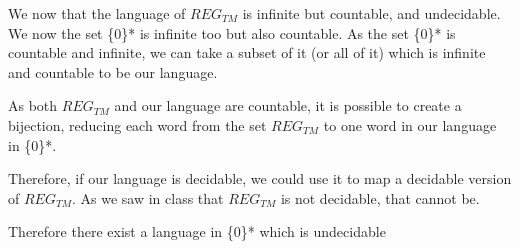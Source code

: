 
We now that the language of $REG_{TM}$ is infinite but countable, and undecidable.
We now the set \{0\}* is infinite too but also countable. As the set \{0\}* is countable and infinite, we can take a subset of it (or all of it) which is infinite and countable to be our language.

As both $REG_{TM}$ and our language are countable, it is possible to create a bijection, reducing each word from the set $REG_{TM}$ to one word in our language in \{0\}*.

Therefore, if our language is decidable, we could use it to map a decidable version of $REG_{TM}$. As we saw in class that $REG_{TM}$ is not decidable, that cannot be.

Therefore there exist a language in \{0\}* which is undecidable